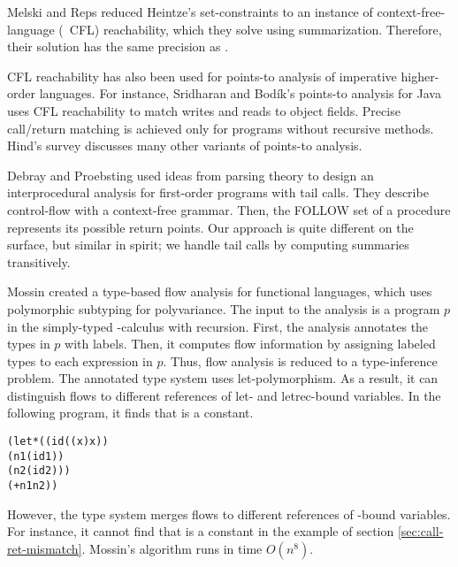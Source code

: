 \documentclass{LMCS}
\theoremstyle{definition} \newtheorem{property}[thm]{Property}
\begin{document}
Melski and Reps \cite{journal/tcs/00/melski/cflReachab} reduced Heintze's
set-constraints \cite{diss/cmu/92/heintze} to an instance of 
context-free-language (\abbrev\ CFL) reachability, which they solve using
summarization.
Therefore, their solution has the same precision as .

CFL reachability has also been used for points-to analysis of imperative 
higher-order languages.
For instance, Sridharan and Bod\'ik's points-to analysis for Java
\cite{conf/pldi/06/sridharan/pointsTo} uses CFL reachability to match writes
and reads to object fields.
Precise call/return matching is achieved only for programs without recursive
methods. 
Hind's survey \cite{conf/paste/01/hind/survey} discusses many other
variants of points-to analysis.

Debray and Proebsting \cite{journal/toplas/97/debray/tailcall} used ideas from
parsing theory to design an interprocedural analysis for first-order programs 
with tail calls.
They describe control-flow with a context-free grammar.
Then, the {\small FOLLOW} set of a procedure represents its possible 
return points.
Our approach is quite different on the surface, but similar in spirit; 
we handle tail calls by computing summaries transitively.

Mossin \cite{diss/diku/96/mossin} created a type-based flow analysis for 
functional languages, which uses poly\-mor\-phic subtyping for polyvariance.
The input to the analysis is a program $p$ in the simply-typed \lam-calculus 
with recursion.
First, the analysis annotates the types in $p$ with labels.
Then, it computes flow information by assigning labeled types to each expression
in $p$.
Thus, flow analysis is reduced to a type-inference problem.
The annotated type system uses let-polymorphism.
As a result, it can distinguish flows to different references of let- and 
letrec-bound variables.
In the following program, it finds that  is a constant.
\begin{center}
  \begin{minipage}{0.35\columnwidth}
    \begin{alltt}
(let* ((id (\lam(x) x))
       (n1 (id 1))
       (n2 (id 2)))
  (+ n1 n2)) \end{alltt}
  \end{minipage}
\end{center}
However, the type system merges flows to different references of \lam-bound
variables.
For instance, it cannot find that  is a constant in the  example
of section \ref{sec:call-ret-mismatch}.
Mossin's algorithm runs in time $O(n^8)$.
\end{document}
